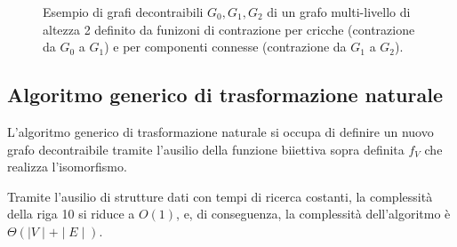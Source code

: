 \begin{figure}[H]
    
    \caption{Esempio di grafi decontraibili $G_0, G_1, G_2$ di un grafo multi-livello di altezza 2 definito da funizoni
    di contrazione per cricche (contrazione da $G_0$ a $G_1$) e per componenti connesse (contrazione da $G_1$ a $G_2$).}
    \label{fig:example4}
\end{figure}

    \subsection{Algoritmo generico di trasformazione naturale}\label{subsec:algoritmo-generico-di-trasformazione-naturale}
    L'algoritmo generico di trasformazione naturale si occupa di definire un nuovo grafo decontraibile tramite
    l'ausilio della funzione biiettiva sopra definita $f_V$ che realizza l'isomorfismo.

    

    Tramite l'ausilio di strutture dati con tempi di ricerca costanti, la complessit\`a della riga 10 si riduce a $O(1)$,
    e, di conseguenza, la complessit\`a dell'algoritmo \`e $\Theta(\mid V \mid+ \mid E \mid )$.





